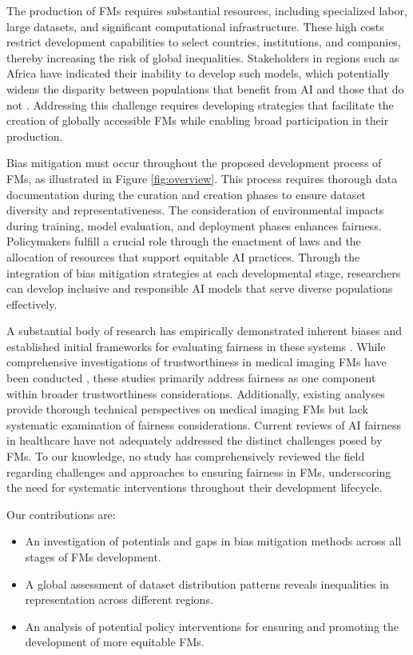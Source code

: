 The production of FMs requires substantial resources, including specialized labor, large datasets, and significant computational infrastructure. These high costs restrict development capabilities to select countries, institutions, and companies, thereby increasing the risk of global inequalities. Stakeholders in regions such as Africa have indicated their inability to develop such models, which potentially widens the disparity between populations that benefit from AI and those that do not \cite{ade-ibijola_artificial_2023}. Addressing this challenge requires developing strategies that facilitate the creation of globally accessible FMs while enabling broad participation in their production.

Bias mitigation must occur throughout the proposed development process of FMs, as illustrated in Figure \ref{fig:overview}. This process requires thorough data documentation during the curation and creation phases to ensure dataset diversity and representativeness. The consideration of environmental impacts during training, model evaluation, and deployment phases enhances fairness. Policymakers fulfill a crucial role through the enactment of laws and the allocation of resources that support equitable AI practices. Through the integration of bias mitigation strategies at each developmental stage, researchers can develop inclusive and responsible AI models that serve diverse populations effectively.

A substantial body of research has empirically demonstrated inherent biases and established initial frameworks for evaluating fairness in these systems \cite{jin_fairmedfm_2024, glocker_risk_2023, khan_how_2023, li_empirical_2024}. While comprehensive investigations of trustworthiness in medical imaging FMs have been conducted \cite{shi_survey_2024}, these studies primarily address fairness as one component within broader trustworthiness considerations. Additionally, existing analyses provide thorough technical perspectives on medical imaging FMs \cite{zhang_challenges_2023, li_progress_2024} but lack systematic examination of fairness considerations. Current reviews of AI fairness in healthcare \cite{chen_algorithmic_2023, du_fairness_2021, mehrabi_survey_2021, ricci_lara_addressing_2022, xu_addressing_2024} have not adequately addressed the distinct challenges posed by FMs. To our knowledge, no study has comprehensively reviewed the field regarding challenges and approaches to ensuring fairness in FMs, underscoring the need for systematic interventions throughout their development lifecycle.

Our contributions are:
\begin{itemize}
\item An investigation of potentials and gaps in bias mitigation methods across all stages of FMs development.
\item A global assessment of dataset distribution patterns reveals inequalities in representation across different regions.
\item An analysis of potential policy interventions for ensuring and promoting the development of more equitable FMs.
\end{itemize}